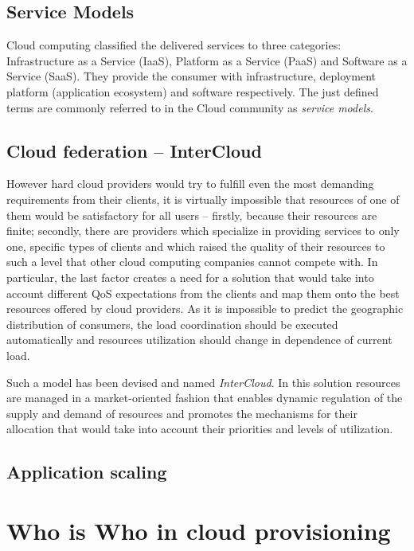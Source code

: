 \documentclass[twocolumn]{svjour3}          %
\begin{document}
\subsection{Service Models}
Cloud computing classified the delivered services to three categories: Infrastructure as a Service (IaaS), Platform as a Service (PaaS) and Software as a Service (SaaS). They provide the consumer with infrastructure, deployment platform (application ecosystem) and software respectively. The just defined terms are commonly referred to in the Cloud community as \emph{service models}.

\subsection{Cloud federation -- InterCloud}
However hard cloud providers would try to fulfill even the most demanding requirements from their clients, it is virtually impossible that resources of one of them would be satisfactory for all users -- firstly, because their resources are finite; secondly, there are providers which specialize in providing services to only one, specific types of clients and which raised the quality of their resources to such a level that other cloud computing companies cannot compete with.
In particular, the last factor creates a need for a solution that would take into account different QoS expectations from the clients and map them onto the best resources offered by cloud providers. As it is impossible to predict the geographic distribution of consumers, the load coordination should be executed automatically and resources utilization should change in dependence of current load.

Such a model has been devised and named \emph{InterCloud}. In this solution resources are managed in a market-oriented fashion that enables dynamic regulation of the supply and demand of resources and promotes the mechanisms for their allocation that would take into account their priorities and levels of utilization.

\subsection{Application scaling}


\section{Who is Who in cloud provisioning}
\end{document}
